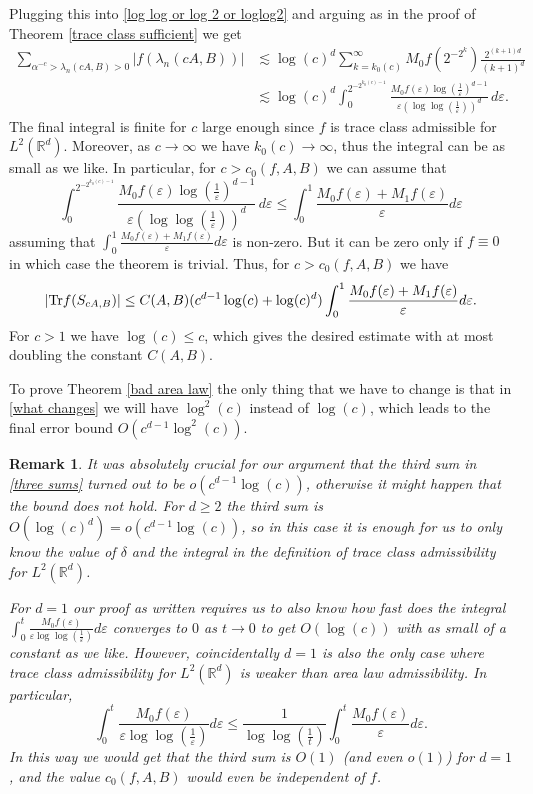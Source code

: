 \documentclass[12pt]{amsart}
\numberwithin{equation}{section}
\newcommand{\R}{\mathbb{R}}
\newcommand{\eps}{\varepsilon}
\newtheorem{remark}[Thm]{Remark}
\begin{document}
Plugging this into \eqref{log log or log 2 or loglog2} and arguing as in the proof of Theorem \ref{trace class sufficient} we get
\begin{equation}\label{trace class condition bound}
\begin{aligned}\sum_{\alpha^{-c}>\lambda_n(cA,B) >0}|f(\lambda_n(cA,B))| &\lesssim \log(c)^d\sum_{k=k_0(c)}^\infty  M_0 f\left(2^{-2^k}\right) \frac{2^{(k+1)d}}{(k+1)^d}\\
&\lesssim \log(c)^d\int_0^{2^{-2^{k_0(c)-1}}}\frac{M_0 f(\eps)\log\left(\frac{1}{\eps}\right)^{d-1}}{\eps \left(\log\log\left(\frac{1}{\eps}\right)\right)^d} \, d\eps.
\end{aligned}
\end{equation}
The final integral is finite for $c$ large enough since $f$ is trace class admissible for $L^2(\R^d)$. Moreover, as $c\to \infty$ we have $k_0(c)\to \infty$, thus the integral can be as small as we like. In particular, for $c > c_0(f, A, B)$ we can assume that 
$$ \int_0^{2^{-2^{k_0(c)-1}}}\frac{M_0 f(\eps)\log\left(\frac{1}{\eps}\right)^{d-1}}{\eps \left(\log\log\left(\frac{1}{\eps}\right)\right)^d} \, d\eps\leq \int_0^1 \frac{M_0 f(\eps) + M_1 f(\eps)}{\eps}d\eps$$
assuming that $\int_0^1 \frac{M_0 f(\eps) + M_1 f(\eps)}{\eps}d\eps$ is non-zero. But it can be zero only if $f\equiv 0$ in which case the theorem is trivial. Thus, for $c > c_0(f, A, B)$ we have
$$|{\rm Tr} f(S_{cA,B})|\le C(A,B)(c^{d-1}\log(c)+\log(c)^d)\int_0^1\frac{M_0f(\eps)+M_1f(\eps)}{\eps}d\eps.$$
For $c > 1$ we have $\log(c) \le c$, which gives the desired estimate with at most doubling the constant $C(A,B)$.

To prove Theorem \ref{bad area law} the only thing that we have to change is that in \eqref{what changes} we will have $\log^2(c)$ instead of $\log(c)$, which leads to the final error bound $O(c^{d-1}\log^2(c))$.
\begin{remark}
 It was absolutely crucial for our argument that the third sum in \eqref{three sums} turned out to be $o(c^{d-1}\log(c))$, otherwise it might happen that the bound does not hold. For $d\ge 2$ the third sum is $O(\log(c)^d) = o(c^{d-1}\log(c))$, so in this case it is enough for us to only know the value of $\delta$ and the integral in the definition of trace class admissibility for $L^2(\R^d)$. 
 
 For $d = 1$ our proof as written requires us to also know how fast does the integral $\int_0^t \frac{M_0f(\eps)}{\eps \log\log(\frac{1}{\eps})}d\eps$ converges to $0$ as $t\to 0$ to get $O(\log(c))$ with as small of a constant as we like. However, coincidentally $d = 1$ is also the only case where trace class admissibility for $L^2(\R^d)$ is weaker than area law admissibility. In particular, 
 $$\int_0^t \frac{M_0f(\eps)}{\eps \log\log(\frac{1}{\eps})}d\eps \le \frac{1}{\log\log(\frac{1}{t})}\int_0^t \frac{M_0f(\eps)}{\eps}d\eps.$$
 In this way we would get that the third sum is $O(1)$ (and even $o(1)$) for $d = 1$, and the value $c_0(f, A, B)$ would even be independent of $f$.
\end{remark}
\end{document}
